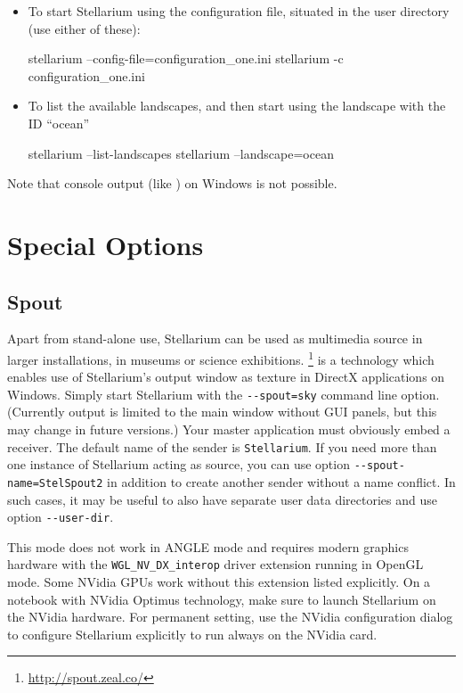 \begin{itemize}
\item To start Stellarium using the configuration file,
   situated in the user directory (use either of
  these):

\begin{commands}
stellarium --config-file=configuration_one.ini
stellarium -c configuration_one.ini
\end{commands}

\item To list the available landscapes, and then start using the
  landscape with the ID ``ocean''
\begin{commands}
stellarium --list-landscapes 
stellarium --landscape=ocean
\end{commands}
\end{itemize}

\noindent Note that console output (like ) on Windows is not possible. 

\section{Special Options}
\label{sec:CommandLineOptions:Special}
\subsection{Spout} 
\label{sec:CommandLineOptions:Special:Spout}
Apart from stand-alone use, Stellarium can be used as multimedia source in larger installations, in museums or science exhibitions. 
\footnote{\url{http://spout.zeal.co/}} is a technology which enables use of Stellarium's 
output window as texture in DirectX applications on Windows. Simply start Stellarium with 
the \texttt{-\/-spout=sky} command line option. (Currently  output is limited to the main window 
without GUI panels, but this may change in future versions.) 
Your master application must obviously embed a  receiver. 
The default name of the  sender is \texttt{Stellarium}. If you need more than one instance of Stellarium acting as source, 
you can use option \texttt{-\/-spout-name=StelSpout2} in addition to create another  sender without a name conflict. 
In such cases, it may be useful to also have separate user data directories and use option \texttt{-\/-user-dir}. 

This mode does not work in ANGLE mode and requires modern graphics hardware with the \texttt{WGL\_NV\_DX\_interop} 
driver extension running in OpenGL mode. Some NVidia GPUs work without this extension listed explicitly. 
On a notebook with NVidia Optimus technology, make sure to launch Stellarium on the NVidia hardware. 
For permanent setting, use the NVidia configuration dialog to configure Stellarium explicitly to run always on the NVidia card.



